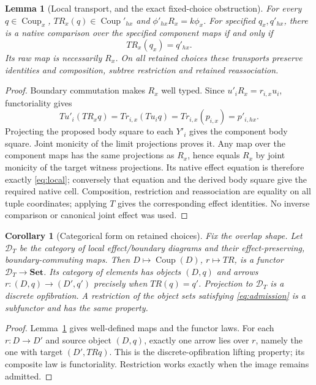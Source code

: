 \documentclass[11pt]{article}
\newtheorem{lemma}[theorem]{Lemma}
\newtheorem{corollary}[theorem]{Corollary}
\newcommand{\Set}{\mathbf{Set}}
\newcommand{\Coup}{\operatorname{Coup}}
\begin{document}
\begin{lemma}[Local transport, and the exact fixed-choice obstruction]\label{lem:transport}
For every $q\in\Coup_x$, $TR_x(q)\in\Coup'_{hx}$ and $\phi'_{hx}R_x=k\phi_x$. For specified $q_x,q'_{hx}$, there is a native comparison over the specified component maps if and only if
\[
 TR_x(q_x)=q'_{hx}. \tag{L}\label{eq:local}
\]
Its raw map is necessarily $R_x$. On all retained choices these transports preserve identities and composition, subtree restriction and retained reassociation.
\end{lemma}
\begin{proof}
Boundary commutation makes $R_x$ well typed. Since $u'_iR_x=r_{i,x}u_i$, functoriality gives
\[
 Tu'_i(TR_xq)=Tr_{i,x}(Tu_iq)=Tr_{i,x}(p_{i,x})=p'_{i,hx}.
\]
Projecting the proposed body square to each $Y'_i$ gives the component body square. Joint monicity of the limit projections proves it. Any map over the component maps has the same projections as $R_x$, hence equals $R_x$ by joint monicity of the target witness projections. Its native effect equation is therefore exactly \eqref{eq:local}; conversely that equation and the derived body square give the required native cell. Composition, restriction and reassociation are equality on all tuple coordinates; applying $T$ gives the corresponding effect identities. No inverse comparison or canonical joint effect was used.
\end{proof}

\begin{corollary}[Categorical form on retained choices]\label{cor:choice-category}
Fix the overlap shape. Let $\mathcal D_T$ be the category of local effect/boundary diagrams and their effect-preserving, boundary-commuting maps. Then $D\mapsto\Coup(D)$, $r\mapsto TR$, is a functor $\mathcal D_T\to\Set$. Its category of elements has objects $(D,q)$ and arrows $r:(D,q)\to(D',q')$ precisely when $TR(q)=q'$. Projection to $\mathcal D_T$ is a discrete opfibration. A restriction of the object sets satisfying \eqref{eq:admission} is a subfunctor and has the same property.
\end{corollary}
\begin{proof}
Lemma~\ref{lem:transport} gives well-defined maps and the functor laws. For each $r:D\to D'$ and source object $(D,q)$, exactly one arrow lies over $r$, namely the one with target $(D',TRq)$. This is the discrete-opfibration lifting property; its composite law is functoriality. Restriction works exactly when the image remains admitted.
\end{proof}
\end{document}
